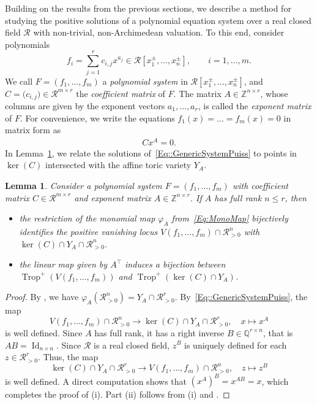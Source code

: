 \documentclass{article}
\newtheorem{lemma}[theorem]{Lemma}
\theoremstyle{definition}
\DeclareMathOperator{\Trop}{Trop}
\DeclareMathOperator{\Id}{Id}
\newcommand{\RR}{\mathcal{R}}
\begin{document}
Building on the results from the previous sections, we describe a method for studying the positive solutions of a polynomial equation system over a real closed field $\RR$ with non-trivial, non-Archimedean valuation. To this end, consider polynomials
\[f_i = \sum_{j = 1}^r c_{i,j}x^{a_j} \in \RR[x_1^\pm,\dots,x_n^\pm], \qquad i = 1, \dots , m. \]
We call $F = (f_1, \dots, f_m)$ a \emph{polynomial system} in $\RR[x_1^\pm, \dots, x_n^\pm]$, and  $C = \big( c_{i,j}\big) \in \mathcal{R}^{m \times r}$ the \emph{coefficient matrix} of $F$. The matrix $A \in \mathbb{Z}^{n \times r}$, whose columns are given by the exponent vectors $a_1, \dots , a_r$, is called the \emph{exponent matrix} of $F$. For convenience, we write the equations $f_1(x) = \dots =  f_m(x) =0$ in matrix form as
\begin{align}
\label{Eq::GenericSystemPuiss}
    C x^A = 0.
\end{align}
In Lemma~\ref{lemma: monomial map is bijective on positive part}, we relate the solutions of~\eqref{Eq::GenericSystemPuiss} to points in $\ker(C)$ intersected with the affine toric variety $Y_A$.




\begin{lemma}
\label{lemma: monomial map is bijective on positive part}
\label{Cor::AtrBijective}
Consider a polynomial system $F=(f_1, \dots , f_m)$ with coefficient matrix $C \in \mathcal{R}^{m\times r}$ and exponent matrix $A \in \mathbb{Z}^{n\times r}$. If $A$ has full rank $n \leq r$, then
\begin{itemize}
\item[(i)] the restriction of the monomial map $\varphi_A$ from~\eqref{Eq:MonoMap} bijectively identifies the positive vanishing locus $V(f_1, \dots, f_m)\cap \RR^n_{>0}$ with $\ker(C) \cap Y_A \cap \RR^n_{>0}$.
\item[(ii)] the linear map given by $A^\top$ induces a bijection between $\Trop^+(V(f_1, \dots, f_m))$ and $\Trop^+(\ker(C)\cap Y_A)$. 
\end{itemize}
\end{lemma}
\begin{proof}
   By , we have $\varphi_A(\RR_{>0}^n) = Y_A \cap \RR^r_{>0}$. By~\eqref{Eq::GenericSystemPuiss}, the map 
    \[V(f_1, \dots, f_m)\cap \RR^n_{>0}  \longrightarrow  \ker(C) \cap Y_A \cap \RR^r_{>0}, \quad x \mapsto x^A \]
    is well defined. Since $A$ has full rank, it has a right inverse $B \in \mathbb{Q}^{r \times n}$, that is $AB = \Id_{n\times n}$. Since $\mathcal{R}$ is a real closed field, $z^B$ is uniquely defined for each $z \in \mathcal{R}^r_{>0}$. Thus, the map 
    \[\ker(C) \cap Y_A \cap \RR^r_{>0} \to  V(f_1, \dots, f_m)\cap \RR^n_{>0}, \quad z \mapsto z^B \]
     is well defined. A direct computation shows that $(x^A)^B = x^{AB}=x$, which completes the proof of (i). Part (ii) follows from (i) and .
\end{proof}
\end{document}
